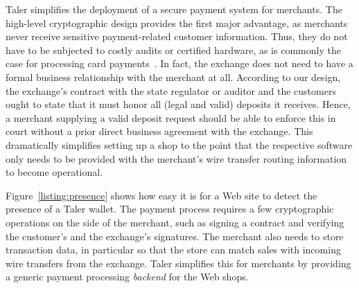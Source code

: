 \documentclass{llncs}
\begin{document}
Taler simplifies the deployment of a secure payment system for
merchants. The high-level cryptographic design provides the first
major advantage, as merchants never receive sensitive payment-related
customer information.  Thus, they do not have to be subjected to
costly audits or certified hardware, as is commonly the case for
processing card payments~\cite{pcidss}. In fact, the exchange does not
need to have a formal business relationship with the merchant at all.
According to our design, the exchange's contract with the state
regulator or auditor and the customers ought to state that it must
honor all (legal and valid) deposits it receives.  Hence, a merchant
supplying a valid deposit request should be able to enforce this in
court without a prior direct business agreement with the exchange.
This dramatically simplifies setting up a shop to the point that the
respective software only needs to be provided with the merchant's wire
transfer routing information to become operational.

Figure~\ref{listing:presence} shows how easy it is for a Web site to
detect the presence of a Taler wallet.  The payment process requires a
few cryptographic operations on the side of the merchant, such as
signing a contract and verifying the customer's and the exchange's
signatures.  The merchant also needs to store transaction data, in
particular so that the store can match sales with incoming wire
transfers from the exchange.  Taler simplifies this for merchants by
providing a generic payment processing {\em backend} for the Web
shops.
\end{document}
